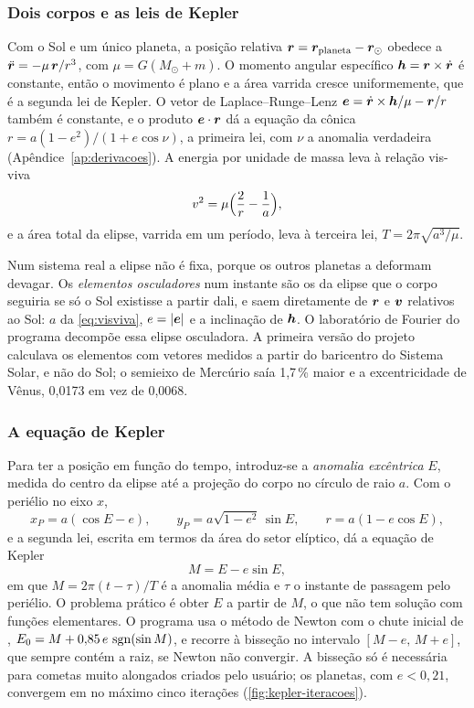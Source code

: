\subsubsection{Dois corpos e as leis de Kepler}\label{sec:doiscorpos}

Com o Sol e um único planeta, a posição relativa $\bm{r} = \bm{r}_\text{planeta}-\bm{r}_\odot$ obedece a $\ddot{\bm{r}} = -\mu\,\bm{r}/r^3$, com $\mu = G(M_\odot+m)$. O momento angular específico $\bm{h} = \bm{r}\times\dot{\bm{r}}$ é constante, então o movimento é plano e a área varrida cresce uniformemente, que é a segunda lei de Kepler. O vetor de Laplace--Runge--Lenz $\bm{e} = \dot{\bm{r}}\times\bm{h}/\mu - \bm{r}/r$ também é constante, e o produto $\bm{e}\cdot\bm{r}$ dá a equação da cônica $r = a(1-e^2)/(1+e\cos\nu)$, a primeira lei, com $\nu$ a anomalia verdadeira (Apêndice~\ref{ap:derivacoes}). A energia por unidade de massa leva à relação vis-viva
\begin{equation}
  v^2 = \mu\Bigl(\frac{2}{r} - \frac{1}{a}\Bigr),
  \label{eq:visviva}
\end{equation}
e a área total da elipse, varrida em um período, leva à terceira lei, $T = 2\pi\sqrt{a^3/\mu}$.

Num sistema real a elipse não é fixa, porque os outros planetas a deformam devagar. Os \emph{elementos osculadores} num instante são os da elipse que o corpo seguiria se só o Sol existisse a partir dali, e saem diretamente de $\bm{r}$ e $\bm{v}$ relativos ao Sol: $a$ da \autoref{eq:visviva}, $e = |\bm{e}|$ e a inclinação de $\bm{h}$. O laboratório de Fourier do programa decompõe essa elipse osculadora. A primeira versão do projeto calculava os elementos com vetores medidos a partir do baricentro do Sistema Solar, e não do Sol; o semieixo de Mercúrio saía 1,7\,\% maior e a excentricidade de Vênus, 0,0173 em vez de 0,0068.

\subsubsection{A equação de Kepler}\label{sec:kepler}

Para ter a posição em função do tempo, introduz-se a \emph{anomalia excêntrica} $E$, medida do centro da elipse até a projeção do corpo no círculo de raio $a$. Com o periélio no eixo $x$,
\begin{equation}
  x_P = a(\cos E - e),\qquad y_P = a\sqrt{1-e^2}\,\sin E,\qquad r = a(1 - e\cos E),
  \label{eq:perifocal}
\end{equation}
e a segunda lei, escrita em termos da área do setor elíptico, dá a equação de Kepler
\begin{equation}
  M = E - e\sin E,
  \label{eq:kepler}
\end{equation}
em que $M = 2\pi(t-\tau)/T$ é a anomalia média e $\tau$ o instante de passagem pelo periélio. O problema prático é obter $E$ a partir de $M$, o que não tem solução com funções elementares. O programa usa o método de Newton com o chute inicial de , $E_0 = M + 0{,}85\,e\,\operatorname{sgn}(\sin M)$, e recorre à bisseção no intervalo $[M-e,\,M+e]$, que sempre contém a raiz, se Newton não convergir. A bisseção só é necessária para cometas muito alongados criados pelo usuário; os planetas, com $e<0{,}21$, convergem em no máximo cinco iterações (\autoref{fig:kepler-iteracoes}).

